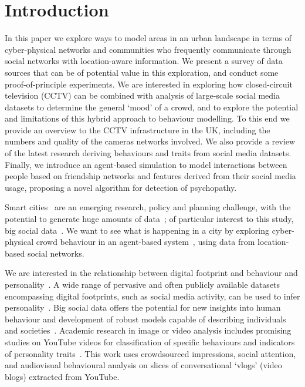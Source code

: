 \documentclass[conference]{IEEEtran}
\begin{document}
\section{Introduction}

In this paper we explore ways to model areas in an urban landscape in
terms of cyber-physical networks and communities who frequently
communicate through social networks with location-aware
information. We present a survey of data sources that can be of
potential value in this exploration, and conduct some
proof-of-principle experiments. We are interested in exploring how
closed-circuit television (CCTV) can be combined with analysis of
large-scale social media datasets to determine the general `mood' of a
crowd, and to explore the potential and limitations of this hybrid
approach to behaviour modelling. To this end we provide an overview to
the CCTV infrastructure in the UK, including the numbers and quality
of the cameras networks involved. We also provide a review of the
latest research deriving behaviours and traits from social media
datasets. Finally, we introduce an agent-based simulation to model
interactions between people based on friendship networks and features
derived from their social media usage, proposing a novel algorithm for
detection of psychopathy.

Smart cities~\cite{goscience:2014,cosgrave-et-al:2014} are an emerging
research, policy and planning challenge, with the potential to
generate huge amounts of data~\cite{arup-et-al:2011}; of particular
interest to this study, big social data~\cite{postsm:2014}. We want to
see what is happening in a city by exploring cyber-physical crowd
behaviour in an agent-based system~\cite{bonabeau:2002}, using data
from location-based social networks.

We are interested in the relationship between digital footprint and
behaviour and
personality~\cite{oatley+crick:2014,oatley-et-al:2006}. A wide range
of pervasive and often publicly available datasets encompassing
digital footprints, such as social media activity, can be used to
infer
personality~\cite{lambiotte+kosinski:2014,oatley-et-al-soccogcomp2015}. Big
social data offers the potential for new insights into human behaviour
and development of robust models capable of describing individuals and
societies~\cite{lazer-et-al:2009}. Academic research in image or video
analysis includes promising studies on YouTube videos for
classification of specific behaviours and indicators of personality
traits~\cite{biel+gatica-perez:2012}. This work uses crowdsourced
impressions, social attention, and audiovisual behavioural analysis on
slices of conversational `vlogs' (video blogs) extracted from YouTube.
\end{document}
